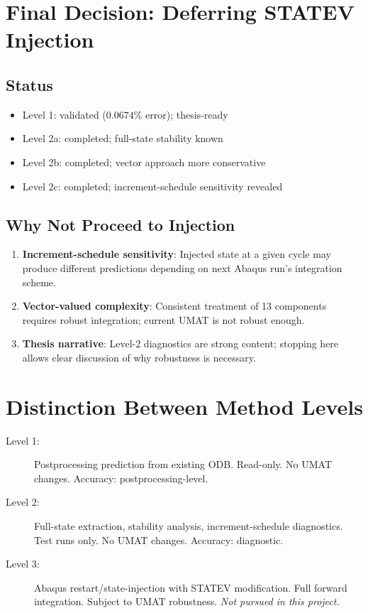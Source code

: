 \documentclass[11pt]{article}
\begin{document}
\section{Final Decision: Deferring STATEV Injection}

\subsection{Status}
\begin{itemize}
  \item Level 1: validated ($0.0674\%$ error); thesis-ready
  \item Level 2a: completed; full-state stability known
  \item Level 2b: completed; vector approach more conservative
  \item Level 2c: completed; increment-schedule sensitivity revealed
\end{itemize}

\subsection{Why Not Proceed to Injection}

\begin{enumerate}
  \item \textbf{Increment-schedule sensitivity}: Injected state at a given cycle may produce different predictions depending on next Abaqus run's integration scheme.
  \item \textbf{Vector-valued complexity}: Consistent treatment of 13 components requires robust integration; current UMAT is not robust enough.
  \item \textbf{Thesis narrative}: Level-2 diagnostics are strong content; stopping here allows clear discussion of why robustness is necessary.
\end{enumerate}

\section{Distinction Between Method Levels}

\begin{description}
  \item[Level 1:] Postprocessing prediction from existing ODB. Read-only. No UMAT changes. Accuracy: postprocessing-level.
  \item[Level 2:] Full-state extraction, stability analysis, increment-schedule diagnostics. Test runs only. No UMAT changes. Accuracy: diagnostic.
  \item[Level 3:] Abaqus restart/state-injection with STATEV modification. Full forward integration. Subject to UMAT robustness. \textit{Not pursued in this project.}
\end{description}
\end{document}
